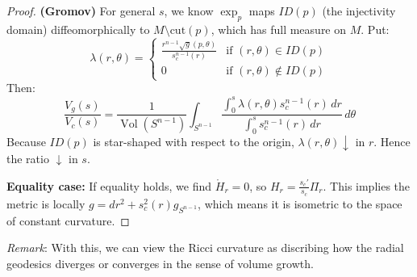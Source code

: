 \documentclass[11pt, a4paper]{article}
\theoremstyle{plain}
\theoremstyle{definition}
\theoremstyle{remark}
\DeclareMathOperator{\Vol}{Vol}
\begin{document}
{\begin{proof}
\textbf{(Gromov)} For general $s$, we know $\exp_p$ maps $ID(p)$ (the injectivity domain) diffeomorphically to $M \setminus \text{cut}(p)$, which has full measure on $M$.
Put:
\[ \lambda(r, \theta) = \begin{cases} 
\frac{r^{n-1} \sqrt{g}(p, \theta)}{s_c^{n-1}(r)} & \text{if } (r, \theta) \in ID(p) \\
0 & \text{if } (r, \theta) \notin ID(p)
\end{cases} \]
Then:
\[ \frac{V_g(s)}{V_c(s)} = \frac{1}{\Vol(S^{n-1})} \int_{S^{n-1}} \frac{\int_0^s \lambda(r, \theta) s_c^{n-1}(r) \, dr}{\int_0^s s_c^{n-1}(r) \, dr} \, d\theta \]
Because $ID(p)$ is star-shaped with respect to the origin, $\lambda(r, \theta) \downarrow$ in $r$. Hence the ratio $\downarrow$ in $s$.

\textbf{Equality case:} If equality holds, we find $\mathring{H}_r = 0$, so $H_r = \frac{s_c'}{s_c} \Pi_r$. This implies the metric is locally $g = dr^2 + s_c^2(r) g_{S^{n-1}}$, which means it is isometric to the space of constant curvature.
\end{proof}
\textit{Remark}: With this, we can view the Ricci curvature as discribing how the radial geodesics diverges or converges in the sense of volume growth. 


}
\end{document}
